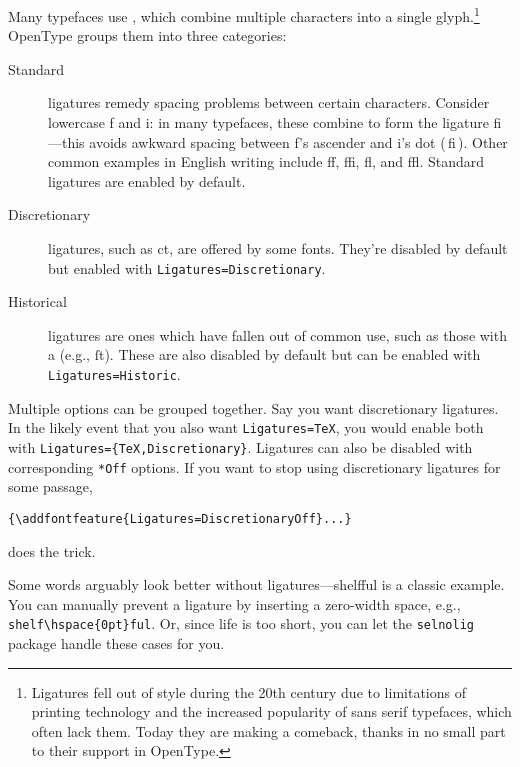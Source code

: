 Many typefaces use , which combine multiple characters
into a single glyph.\punckern\footnote{Ligatures fell out
of style during the 20{th}
century due to limitations of printing technology and the increased popularity
of sans serif typefaces, which often lack them.
Today they are making a comeback,
thanks in no small part to their support in OpenType.}
OpenType groups them into three categories:
\begin{description}
\item[Standard] ligatures remedy spacing problems between certain characters.
    Consider lowercase f and i: in many typefaces,
    these combine to form the ligature fi---this avoids
    awkward spacing between f's ascender and i's dot
    { (\,fi\,)}.
    Other common examples in English writing include ff,
    ffi, fl, and ffl.
    Standard ligatures are enabled by default.
\item[Discretionary] ligatures, such as
    {ct},
    are offered by some fonts.
    They're disabled by default but enabled with
    \verb|Ligatures=Discretionary|.
\item[Historical] ligatures are ones which have fallen out of common use,
    such as those with a  (e.g., ſt).
    These are also disabled by default
    but can be enabled with \verb|Ligatures=Historic|.
\end{description}
Multiple options can be grouped together.
Say you want discretionary ligatures.
In the likely event that you also want \verb|Ligatures=TeX|,
you would enable both with
\verb|Ligatures={TeX,Discretionary}|.
Ligatures can also be disabled with corresponding \verb|*Off|
options. If you want to stop using discretionary ligatures for some passage,
\begin{leftfigure}
\begin{lstlisting}
{\addfontfeature{Ligatures=DiscretionaryOff}...}
\end{lstlisting}
\end{leftfigure}
does the trick.

Some words arguably look better without ligatures---\mbox{shelfful}
is a classic example.\punckern{}
You can manually prevent a ligature by inserting a zero-width space, e.g.,
\verb|shelf\hspace{0pt}ful|.
Or, since life is too short, you can let the \texttt{selnolig} package
handle these cases for you.

